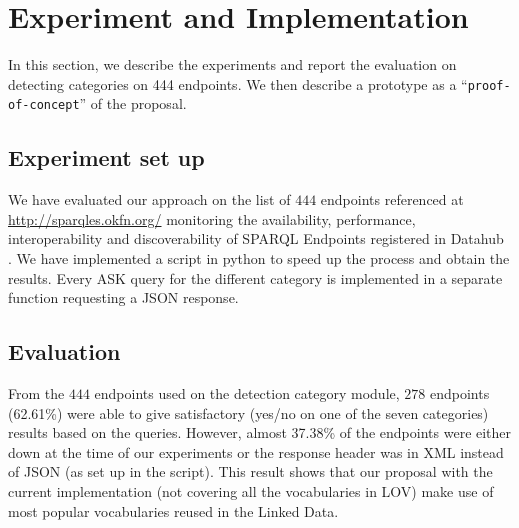 \section{Experiment and Implementation}
\label{sec:evaluation}
In this section, we describe the experiments and report the evaluation on detecting categories on 444 endpoints. We then describe a prototype as a ``\texttt{proof-of-concept}'' of the proposal. 

\subsection{Experiment set up}
We have evaluated our approach on the list of $444$ endpoints referenced at \url{http://sparqles.okfn.org/} monitoring the availability, performance, interoperability and discoverability of SPARQL Endpoints registered in Datahub \cite{buil2013} . We have implemented a script in python to speed up the process and obtain the results. Every ASK query for the different category is implemented in a separate function requesting a JSON response.
 

\subsection{Evaluation}
From the $444$ endpoints used on the detection category module, $278$ endpoints (62.61\%) were able to give satisfactory (yes/no on one of the seven categories) results based on the queries. However, almost 37.38\% of the endpoints were either down at the time of our experiments or the response header was in XML instead of JSON (as set up in the script). This result shows that our proposal with the current implementation (not covering all the vocabularies in LOV) make use of most popular vocabularies reused in the Linked Data. 
\begin{table}[!htbp]
\end{table}

